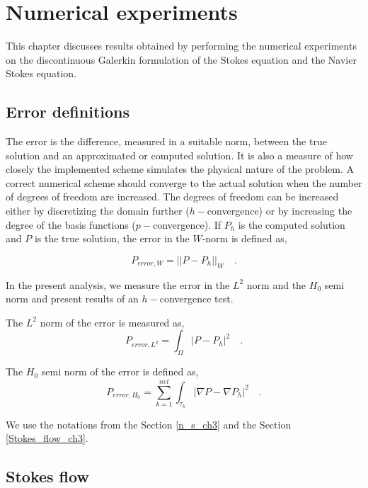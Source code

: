 \documentclass[a4paper]{book}
\begin{document}
\chapter{Numerical experiments}

This chapter discusses results obtained by performing the numerical experiments on the discontinuous Galerkin formulation of the Stokes equation and the Navier Stokes equation.

\section{Error definitions}

The error is the difference, measured in a suitable norm, between the true solution and an approximated or computed solution. It is also a measure of how closely the implemented scheme simulates the physical nature of the problem. A correct numerical scheme should converge to the actual solution when the number of degrees of freedom are increased. The degrees of freedom can be increased either by discretizing the domain further ($h-$convergence) or by increasing the degree of the basis functions ($p-$convergence). If $P_h$ is the computed solution and $P$ is the true solution, the error in the $W$-norm is defined as,

\begin{equation} \label{error_definition}
P_{error,W} = ||P - P_h||_{W} \quad \mathrm{.}
\end{equation}

In the present analysis, we measure the error in the $L^2$ norm and the $H_0$ semi norm and present results of an $h-$convergence test.

The $L^2$ norm of the error is measured as,\begin{equation}
P_{error,L^2} = \int_{\Omega} |P - P_h|^2 \quad \mathrm{.}
\end{equation}

The $H_0$ semi norm of the error is defined as,\begin{equation}
P_{error,H_0} = \sum_{k=1}^{nel} \int_{\tau_k} |\nabla P - \nabla P_h|^2 \quad \mathrm{.}
\end{equation}

We use the notations from the Section \ref{n_s_ch3} and the Section \ref{Stokes_flow_ch3}.

\section{Stokes flow}\label{Stokes-ch5}
\end{document}
